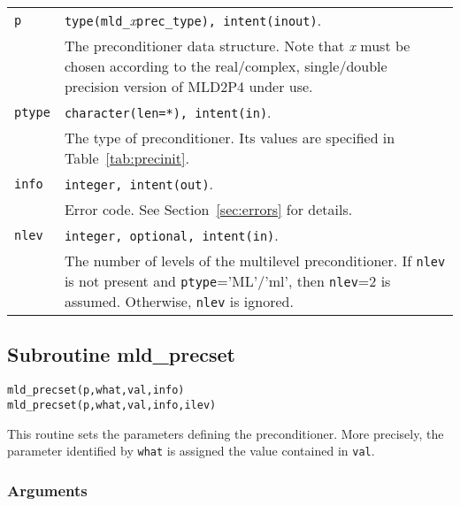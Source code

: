 \begin{tabular}{p{1.2cm}p{10.6cm}}
\verb|p|      & \verb|type(mld_|\emph{x}\verb|prec_type), intent(inout)|.\\
              & The preconditioner data structure. Note that \emph{x} must be chosen according
                to the real/complex, single/double precision version of MLD2P4 under use.\\
\verb|ptype|  & \verb|character(len=*), intent(in)|.\\
              & The type of preconditioner. Its values are specified in Table~\ref{tab:precinit}.\\
\verb|info|   & \verb|integer, intent(out)|.\\
              & Error code. See Section~\ref{sec:errors} for details.\\
\verb|nlev|   & \verb|integer, optional, intent(in)|.\\
              & The number of levels of the multilevel preconditioner.
                If \verb|nlev| is not present and \verb|ptype|='ML'/'ml', 
                then \verb|nlev|=2 is assumed. Otherwise, \verb|nlev| is ignored.
\end{tabular}


\subsection{Subroutine mld\_precset\label{sec:precset}}

\begin{center}
\verb|mld_precset(p,what,val,info)|\\
\verb|mld_precset(p,what,val,info,ilev)|
\end{center}

\noindent
This routine sets the parameters defining the preconditioner. More
precisely, the parameter identified by \verb|what| is assigned the value
contained in \verb|val|.

\subsubsection*{Arguments}

